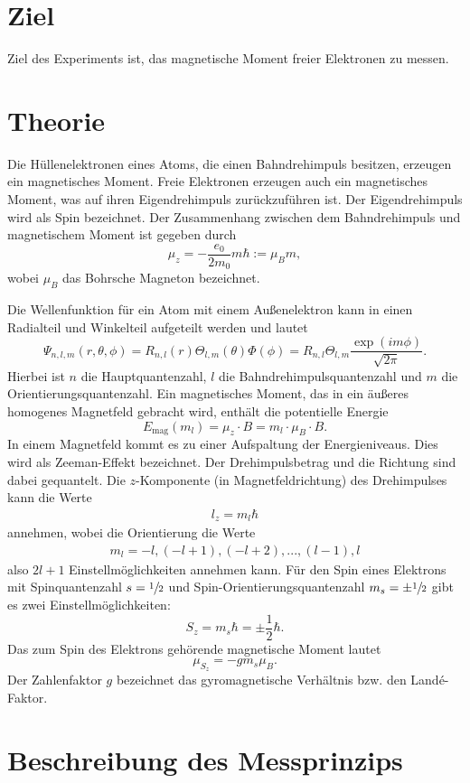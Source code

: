 \section{Ziel}
Ziel des Experiments ist, das magnetische Moment freier Elektronen zu messen.

\section{Theorie}
Die Hüllenelektronen eines Atoms, die einen Bahndrehimpuls besitzen, erzeugen ein magnetisches Moment.
Freie Elektronen erzeugen auch ein magnetisches Moment, was auf ihren Eigendrehimpuls zurückzuführen ist.
Der Eigendrehimpuls wird als Spin bezeichnet.
Der Zusammenhang zwischen dem Bahndrehimpuls und magnetischem Moment ist gegeben durch
\begin{equation}
  \mu_z = -\frac{e_0}{2m_0}m\hbar := \mu_Bm,
\end{equation}
wobei $\mu_B$ das Bohrsche Magneton bezeichnet.

Die Wellenfunktion für ein Atom mit einem Außenelektron kann in einen Radialteil und Winkelteil aufgeteilt werden und lautet
\begin{equation*}
  \Psi_{n,l,m}(r,\theta,\phi) = R_{n,l}(r)\Theta_{l,m}(\theta)\Phi(\phi) = R_{n,l}\Theta_{l,m}\frac{\exp(im\phi)}{\sqrt{2\pi}}.
\end{equation*}
Hierbei ist $n$ die Hauptquantenzahl, $l$ die Bahndrehimpulsquantenzahl und $m$ die Orientierungsquantenzahl.
Ein magnetisches Moment, das in ein äußeres homogenes Magnetfeld gebracht wird, enthält die potentielle Energie
\begin{equation*}
  E_{\text{mag}}(m_l) = \mu_z\cdot{B} = m_l\cdot\mu_B\cdot{B}.
\end{equation*}
In einem Magnetfeld kommt es zu einer Aufspaltung der Energieniveaus.
Dies wird als Zeeman-Effekt bezeichnet.
Der Drehimpulsbetrag und die Richtung sind dabei gequantelt.
Die $z$-Komponente (in Magnetfeldrichtung) des Drehimpulses kann die Werte
\begin{align*}
  l_z = m_l \hbar
\end{align*}
annehmen, wobei die Orientierung die Werte
\begin{align*}
  m_l = -l, (-l+1),(-l+2),...,(l-1),l
\end{align*}
also $2l+1$ Einstellmöglichkeiten annehmen kann.
Für den Spin eines Elektrons mit Spinquantenzahl $s = \sfrac{1}{2}$ und Spin-Orientierungsquantenzahl $m_s = \pm\sfrac{1}{2}$ gibt es zwei Einstellmöglichkeiten:
\begin{equation*}
  S_z = m_s\hbar = \pm\frac{1}{2}\hbar.
\end{equation*}
Das zum Spin des Elektrons gehörende magnetische Moment lautet
\begin{equation}
  \mu_{S_z} = -gm_s\mu_B.
\end{equation}
Der Zahlenfaktor $g$ bezeichnet das gyromagnetische Verhältnis bzw. den Landé-Faktor.

\section{Beschreibung des Messprinzips}
